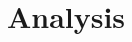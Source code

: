 \documentclass[a4paper,landscape,8pt]{extarticle}
\title{Analysis}
\date{}
\begin{document}
\setlength{\belowdisplayskip}{4pt} \setlength{\belowdisplayshortskip}{4pt}
\setlength{\abovedisplayskip}{4pt} \setlength{\abovedisplayshortskip}{4pt}

\allowdisplaybreaks

\begin{multicols*}{4}
\raggedcolumns

\maketitle

\setcounter{tocdepth}{2}






\end{multicols*}
\end{document}
